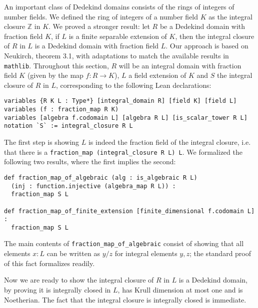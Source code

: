 \documentclass[a4paper,USenglish,cleveref, autoref, thm-restate]{lipics-v2021}
\newcommand{\lean}[1]{\texttt{#1}\xspace} %
\newcommand{\mathlib}{\texttt{mathlib}\xspace}
\newcommand{\Z}{\mathbb{Z}}
\begin{document}
An important class of Dedekind domains consists of the rings of integers of number fields.
We defined the ring of integers of a number field $K$ as the integral closure $\Z$ in $K$.
We proved a stronger result: let $R$ be a Dedekind domain with fraction field $K$, if $L$ is a finite separable extension of $K$, then the integral closure of $R$ in $L$ is a Dedekind domain with fraction field $L$.
Our approach is based on Neukirch, theorem 3.1, with adaptations to match the available results in \mathlib. %
Throughout this section, $R$ will be an integral domain with fraction field $K$ (given by the map $f : R \to K$), $L$ a field extension of $K$ and $S$ the integral closure of $R$ in $L$,
corresponding to the following Lean declarations:
\begin{lstlisting}
variables {R K L : Type*} [integral_domain R] [field K] [field L]
variables (f : fraction_map R K)
variables [algebra f.codomain L] [algebra R L] [is_scalar_tower R L]
notation `S` := integral_closure R L
\end{lstlisting}

The first step is showing $L$ is indeed the fraction field of the integral closure,
i.e. that there is a \lean{fraction\_map (integral\_closure R L) L}.
We formalized the following two results, where the first implies the second:
\begin{lstlisting}
def fraction_map_of_algebraic (alg : is_algebraic R L)
  (inj : function.injective (algebra_map R L)) :
  fraction_map S L

def fraction_map_of_finite_extension [finite_dimensional f.codomain L] :
  fraction_map S L
\end{lstlisting}
The main contents of \lean{fraction\_map\_of\_algebraic} consist of showing that all elements $x : L$ can be written as $y / z$ for integral elements $y, z$;
the standard proof of this fact formalizes readily. %

Now we are ready to show the integral closure of $R$ in $L$ is a Dedekind domain,
by proving it is integrally closed in $L$, has Krull dimension at most one and is Noetherian.
The fact that the integral closure is integrally closed is immediate.
\end{document}
